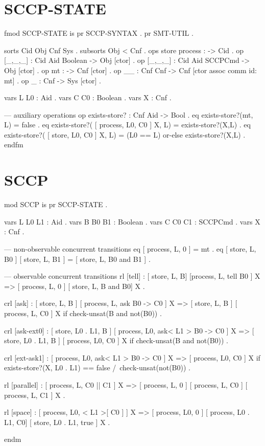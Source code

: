 \section{SCCP-STATE}
\label{state.appendix}

\begin{maude}
fmod SCCP-STATE is
  pr SCCP-SYNTAX .
  pr SMT-UTIL .

  sorts Cid Obj Cnf Sys .
  subsorts Obj < Cnf .
  ops store process : -> Cid .
  op [_,_,_] : Cid Aid Boolean -> Obj [ctor] .
  op [_,_,_] : Cid Aid SCCPCmd -> Obj [ctor] .
  op mt : -> Cnf [ctor] .
  op __ : Cnf Cnf -> Cnf [ctor assoc comm id: mt] .
  op {_} : Cnf -> Sys [ctor] .

  vars L L0    : Aid .
  vars C C0    : Boolean .
  vars X       : Cnf .

  --- auxiliary operations
  op exists-store? : Cnf Aid -> Bool .
  eq exists-store?(mt, L)
   = false .
  eq exists-store?( [ process, L0, C0 ] X, L)
   = exists-store?(X,L) .
  eq exists-store?( [ store, L0, C0 ] X, L)
   = (L0 == L) or-else exists-store?(X,L) .
endfm
\end{maude}

\section{SCCP}
\label{sccp.appendix}

\begin{maude}
mod SCCP is
  pr SCCP-STATE .

  vars L L0 L1 : Aid .
  vars B B0 B1 : Boolean .
  vars C C0 C1 : SCCPCmd .
  vars X : Cnf .
  
  --- non-observable concurrent transitions
  eq [ process, L, 0 ]
   = mt .
  eq [ store, L, B0 ] [ store, L, B1 ]
   = [ store, L, B0 and B1 ] .

  --- observable concurrent transitions
  rl [tell] :
     { [ store, L, B] [process, L, tell B0 ] X }
  => { [ process, L, 0 ] [ store, L, B and B0] X } .

 crl [ask] :
     { [ store, L, B ] [ process, L, ask B0  -> C0 ] X }
  => { [ store, L, B ] [ process, L, C0 ] X }
  if check-unsat(B and not(B0)) .

 crl [ask-ext0] :
     { [ store, L0 . L1, B ] [ process, L0, ask< L1 > B0  -> C0 ] X }
  => { [ store, L0 . L1, B ] [ process, L0, C0 ] X }
  if check-unsat(B and not(B0)) . 

 crl [ext-ask1] :
     { [ process, L0, ask< L1 > B0  -> C0 ] X }
  => { [ process, L0, C0 ] X }
  if exists-store?(X, L0 . L1) == false
  /\ check-unsat(not(B0)) . 

  rl [parallel] :
     { [ process, L, C0 || C1 ] X }
  => { [ process, L, 0 ] [ process, L, C0 ] [ process, L, C1 ] X } .

  rl [space] :
     { [ process, L0, < L1 >[ C0 ] ] X } 
  => { [ process, L0, 0 ] [ process, L0 . L1, C0] [ store, L0 . L1, true ] X } .

endm
\end{maude}
